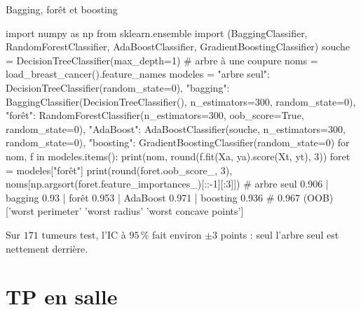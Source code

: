 \documentclass[aspectratio=169,11pt]{beamer}
\begin{document}
\begin{frame}[fragile]{Bagging, forêt et boosting}
\begin{python}[basicstyle=\ttfamily\scriptsize]
import numpy as np
from sklearn.ensemble import (BaggingClassifier, RandomForestClassifier,
                              AdaBoostClassifier, GradientBoostingClassifier)
souche = DecisionTreeClassifier(max_depth=1)          # arbre à une coupure
noms = load_breast_cancer().feature_names
modeles = {"arbre seul": DecisionTreeClassifier(random_state=0),
           "bagging": BaggingClassifier(DecisionTreeClassifier(),
                                        n_estimators=300, random_state=0),
           "forêt": RandomForestClassifier(n_estimators=300, oob_score=True, random_state=0),
           "AdaBoost": AdaBoostClassifier(souche, n_estimators=300, random_state=0),
           "boosting": GradientBoostingClassifier(random_state=0)}
for nom, f in modeles.items():
    print(nom, round(f.fit(Xa, ya).score(Xt, yt), 3))
foret = modeles["forêt"]
print(round(foret.oob_score_, 3), noms[np.argsort(foret.feature_importances_)[::-1][:3]])
# arbre seul 0.906 | bagging 0.93 | forêt 0.953 | AdaBoost 0.971 | boosting 0.936
# 0.967 (OOB) ['worst perimeter' 'worst radius' 'worst concave points']
\end{python}
\vskip-1mm
{\small\color{cnfGris}Sur $171$ tumeurs test, l'IC à $95\,\%$ fait environ $\pm3$ points : seul l'arbre seul est nettement derrière.}
\end{frame}

\section{TP en salle}
\end{document}

